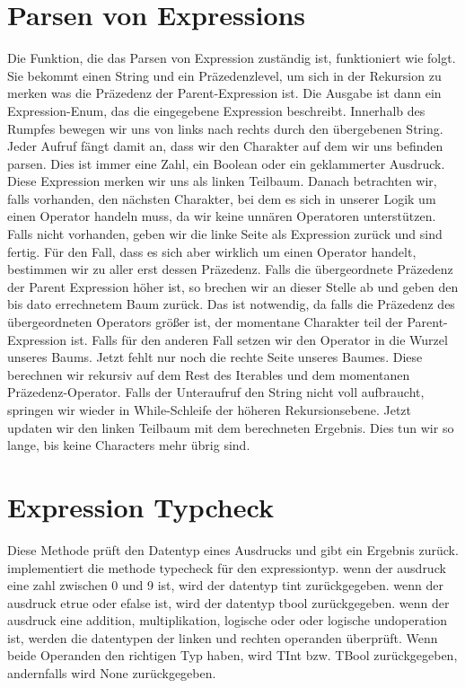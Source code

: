 \documentclass[a4paper, 1ppt]{article}
\begin{document}
\section{Parsen von Expressions}
Die Funktion, die das Parsen von Expression zuständig ist, funktioniert wie folgt.
Sie bekommt einen String und ein Präzedenzlevel, um sich in der Rekursion zu merken
was die Präzedenz der Parent-Expression ist. Die Ausgabe ist dann ein Expression-Enum, das die eingegebene Expression beschreibt.
Innerhalb des Rumpfes bewegen wir uns von links nach rechts durch den übergebenen String.
Jeder Aufruf fängt damit an, dass wir den Charakter auf dem wir uns befinden parsen.
Dies ist immer eine Zahl, ein Boolean oder ein geklammerter Ausdruck. 
Diese Expression merken wir uns als linken Teilbaum.
Danach betrachten wir, falls vorhanden, den nächsten Charakter, bei dem es sich in unserer Logik um einen Operator handeln muss, 
da wir keine unnären Operatoren unterstützen. Falls nicht vorhanden, geben wir die linke Seite als Expression zurück und sind fertig.
Für den Fall, dass es sich aber wirklich um einen Operator handelt, bestimmen wir zu aller erst dessen Präzedenz.
Falls die übergeordnete Präzedenz der Parent Expression höher ist, so brechen wir an dieser Stelle ab und geben den bis dato errechnetem Baum zurück.
Das ist notwendig, da falls die Präzedenz des übergeordneten Operators größer ist, der momentane Charakter teil der Parent-Expression ist.
Falls für den anderen Fall setzen wir den Operator in die Wurzel unseres Baums. 
Jetzt fehlt nur noch die rechte Seite unseres Baumes.
Diese berechnen wir rekursiv auf dem Rest des Iterables und dem momentanen Präzedenz-Operator.
Falls der Unteraufruf den String nicht voll aufbraucht, springen wir wieder in While-Schleife der höheren Rekursionsebene.
Jetzt updaten wir den linken Teilbaum mit dem berechneten Ergebnis.
Dies tun wir so lange, bis keine Characters mehr übrig sind.
\newpage
\section{Expression Typcheck}
Diese Methode prüft den Datentyp eines Ausdrucks und gibt ein Ergebnis zurück.
implementiert die methode typecheck für den expressiontyp.
wenn der ausdruck eine zahl zwischen 0 und 9 ist, wird der datentyp tint zurückgegeben.
wenn der ausdruck etrue oder efalse ist, wird der datentyp tbool zurückgegeben.
wenn der ausdruck eine addition, multiplikation, logische oder oder logische undoperation ist, werden die datentypen der linken und rechten operanden überprüft.
Wenn beide Operanden den richtigen Typ haben, wird TInt bzw.
TBool zurückgegeben, andernfalls wird None zurückgegeben.
\end{document}
